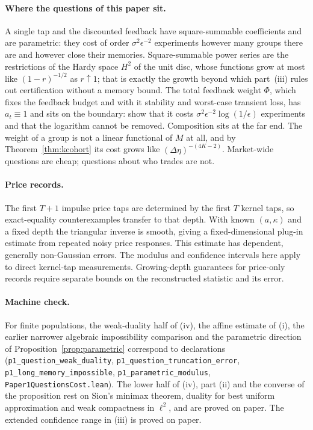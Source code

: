 \documentclass[12pt]{article}
\theoremstyle{definition}
\theoremstyle{remark}
\begin{document}
\paragraph{Where the questions of this paper sit.} A single tap and the discounted feedback have square-summable coefficients and are parametric: they cost of order $\sigma^2\epsilon^{-2}$ experiments however many groups there are and however close their memories. Square-summable power series are the restrictions of the Hardy space $H^2$ of the unit disc, whose functions grow at most like $(1-r)^{-1/2}$ as $r\uparrow1$; that is exactly the growth beyond which part~(iii) rules out certification without a memory bound. The total feedback weight $\Phi$, which fixes the feedback budget and with it stability and worst-case transient loss, has $a_t\equiv1$ and sits on the boundary: \citet{niroula2026b} show that it costs $\sigma^2\epsilon^{-2}\log(1/\epsilon)$ experiments and that the logarithm cannot be removed. Composition sits at the far end. The weight of a group is not a linear functional of $M$ at all, and by Theorem~\ref{thm:kcohort} its cost grows like $(\Delta\eta)^{-(4K-2)}$. Market-wide questions are cheap; questions about who trades are not.

\paragraph{Price records.} The first $T+1$ impulse price taps are determined by the first $T$ kernel taps, so exact-equality counterexamples transfer to that depth. With known $(a,\kappa)$ and a fixed depth the triangular inverse is smooth, giving a fixed-dimensional plug-in estimate from repeated noisy price responses. This estimate has dependent, generally non-Gaussian errors. The modulus and confidence intervals here apply to direct kernel-tap measurements. Growing-depth guarantees for price-only records require separate bounds on the reconstructed statistic and its error.

\paragraph{Machine check.} For finite populations, the weak-duality half of (iv), the affine estimate of (i), the earlier narrower algebraic impossibility comparison and the parametric direction of Proposition~\ref{prop:parametric} correspond to declarations (\texttt{p1\_question\_weak\_duality}, \texttt{p1\_question\_truncation\_error}, \texttt{p1\_long\_memory\_impossible}, \texttt{p1\_parametric\_modulus}, \nolinkurl{Paper1QuestionsCost.lean}). The lower half of (iv), part (ii) and the converse of the proposition rest on Sion's minimax theorem, duality for best uniform approximation and weak compactness in $\ell^2$, and are proved on paper. The extended confidence range in (iii) is proved on paper.
\end{document}
